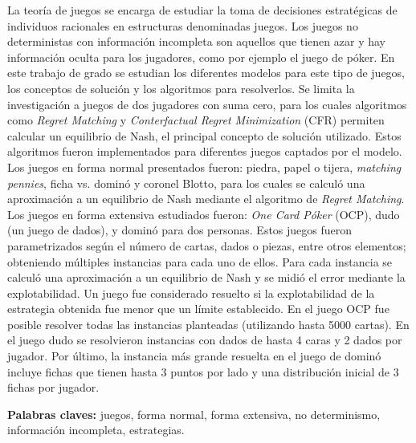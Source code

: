 \begin{resumen}
    La teoría de juegos se encarga de estudiar la toma de decisiones estratégicas de individuos racionales en estructuras denominadas juegos. Los juegos no deterministas con información incompleta son aquellos que tienen azar y hay información oculta para los jugadores, como por ejemplo el juego de póker. En este trabajo de grado se estudian los diferentes modelos para este tipo de juegos, los conceptos de solución y los algoritmos para resolverlos. Se limita la investigación a juegos de dos jugadores con suma cero, para los cuales algoritmos como \textit{Regret Matching} y \textit{Conterfactual Regret Minimization} (CFR) permiten calcular un equilibrio de Nash, el principal concepto de solución utilizado. Estos algoritmos fueron implementados para diferentes juegos captados por el modelo. Los juegos en forma normal presentados fueron: piedra, papel o tijera, \textit{matching pennies}, ficha vs. dominó y coronel Blotto, para los cuales se calculó una aproximación a un equilibrio de Nash mediante el algoritmo de \textit{Regret Matching}. Los juegos en forma extensiva estudiados fueron: \textit{One Card Póker} (OCP), dudo (un juego de dados), y dominó para dos personas. Estos juegos fueron parametrizados según el número de cartas, dados o piezas, entre otros elementos; obteniendo múltiples instancias para cada uno de ellos. Para cada instancia se calculó una aproximación a un equilibrio de Nash y se midió el error mediante la explotabilidad. Un juego fue considerado resuelto si la explotabilidad de la estrategia obtenida fue menor que un límite establecido. En el juego OCP fue posible resolver todas las instancias planteadas (utilizando hasta 5000 cartas). En el juego dudo se resolvieron instancias con dados de hasta 4 caras y 2 dados por jugador. Por último, la instancia más grande resuelta en el juego de dominó incluye fichas que tienen hasta 3 puntos por lado y una distribución inicial de 3 fichas por jugador.
    
    \vfill
    \textbf{Palabras claves:} juegos, forma normal, forma extensiva, no determinismo, información incompleta, estrategias.
\end{resumen}